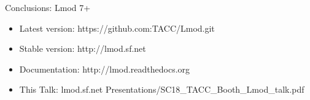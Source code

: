 \documentclass{beamer}
\begin{document}
\begin{frame}{Conclusions: Lmod 7+}
  \begin{itemize}
    \item Latest version: https://github.com:TACC/Lmod.git
    \item Stable version: http://lmod.sf.net
    \item Documentation:  http://lmod.readthedocs.org
    \item This Talk: lmod.sf.net Presentations/SC18\_TACC\_Booth\_Lmod\_talk.pdf
  \end{itemize}
\end{frame}
\end{document}
